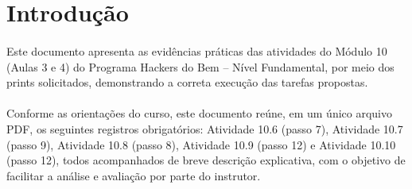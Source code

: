 \section{Introdução}

\paragraph{}
Este documento apresenta as evidências práticas das atividades do Módulo 10
(Aulas 3 e 4) do Programa Hackers do Bem -- Nível Fundamental, por meio dos
prints solicitados, demonstrando a correta execução das tarefas propostas.

\paragraph{}
Conforme as orientações do curso, este documento reúne, em um único arquivo
PDF, os seguintes registros obrigatórios: Atividade 10.6 (passo 7), Atividade
10.7 (passo 9), Atividade 10.8 (passo 8), Atividade 10.9 (passo 12) e Atividade
10.10 (passo 12), todos acompanhados de breve descrição explicativa, com o
objetivo de facilitar a análise e avaliação por parte do instrutor.

